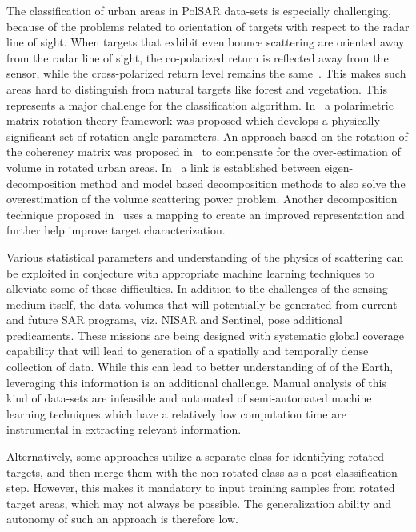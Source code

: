 The classification of urban areas in PolSAR data-sets is especially challenging, because of the problems related to orientation of targets with respect to the radar line of sight.
When targets that exhibit even bounce scattering are oriented away from the radar line of sight, the co-polarized return is reflected away from the sensor, while the cross-polarized return level remains the same~\cite{yamaguchi2011_y4r,7862796}. This makes such areas hard to distinguish from natural targets like forest and vegetation. This represents a major challenge for the classification algorithm. In~\cite{chen2014uniform} a polarimetric matrix rotation theory framework was proposed which develops a physically significant set of rotation angle parameters.  An approach based on the rotation of the coherency matrix was proposed in~\cite{yamaguchi2011four} to compensate for the over-estimation of volume in rotated urban areas. In~\cite{zou2016eigen}   a link is established between eigen-decomposition method and model based decomposition methods to also solve the overestimation of the volume scattering power problem. Another decomposition technique proposed in~\cite{7872383} uses a mapping to create an improved representation and further help improve target characterization. 

Various statistical parameters and understanding of the physics of scattering can be exploited in conjecture with appropriate machine learning techniques to alleviate some of these difficulties. In addition to the challenges of the sensing medium itself, the data volumes that will potentially be generated from current and future SAR programs, viz. NISAR and Sentinel, pose  additional predicaments. These missions are being designed with systematic global coverage capability that will lead to generation of a spatially and temporally dense collection of data. While this can lead to better understanding of of the Earth, leveraging this information is an additional challenge. Manual analysis of this kind of data-sets are infeasible and automated of semi-automated machine learning techniques which have a relatively low computation time are instrumental in extracting relevant information. 

Alternatively, some approaches utilize a separate class for identifying rotated targets, and then merge them with the non-rotated class as a post classification step.  However, this makes it mandatory to input training samples from rotated target areas, which may not always be possible. The generalization ability and autonomy of such an approach is therefore low.

